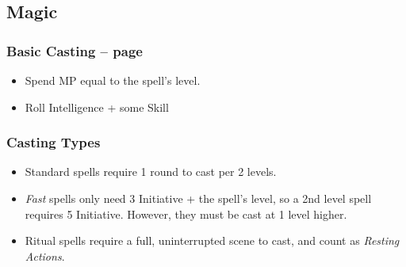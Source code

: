 \begin{multicols}{2}
\begin{itemize}
\end{itemize}

\subsection{Magic}

\subsubsection{Basic Casting -- page \pageref{basiccasting}}

\begin{itemize}

	\item{Spend MP equal to the spell's level.}
	\item{Roll Intelligence + some Skill}

\end{itemize}

\subsubsection{Casting Types}

\begin{itemize}

	\item{Standard spells require 1 round to cast per 2 levels.}
	\item{\textit{Fast} spells only need 3 Initiative + the spell's level, so a 2nd level spell requires 5 Initiative.
	However, they must be cast at 1 level higher.}
	\item{Ritual spells require a full, uninterrupted scene to cast, and count as \textit{Resting Actions}.}

\end{itemize}

\end{multicols}
